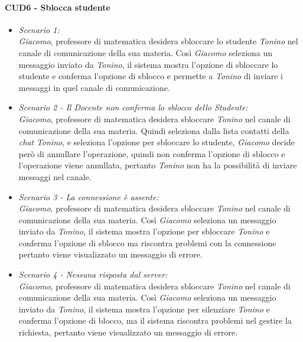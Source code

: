 \paragraph{CUD6 - Sblocca studente\\}
\begin{itemize}
	\item \textit{Scenario 1:\\}
	\textit{Giacomo}, professore di matematica desidera sbloccare lo studente \textit{Tonino} nel canale di comunicazione della sua materia. Così \textit{Giacomo} seleziona un messaggio inviato da \textit{Tonino}, il sistema mostra l’opzione di sbloccare lo studente e conferma l’opzione di sblocco e permette a \textit{Tonino} di inviare i messaggi in quel canale di comunicazione.\\
	
	\item \textit{Scenario 2 - Il Docente non conferma lo sblocco dello Studente:\\}
	\textit{Giacomo}, professore di matematica desidera sbloccare \textit{Tonino} nel canale di comunicazione della sua materia. Quindi seleziona dalla lista contatti della \textit{chat} \textit{Tonino}, e seleziona l’opzione per sbloccare lo studente, \textit{Giacomo} decide però di annullare l’operazione, quindi non conferma l’opzione di sblocco e l’operazione viene annullata, pertanto \textit{Tonino} non ha la possibilità di inviare messaggi nel canale.\\
	
	\item \textit{Scenario 3 - La connessione è assente:\\}
	\textit{Giacomo}, professore di matematica desidera sbloccare \textit{Tonino} nel canale di comunicazione della sua materia. Così \textit{Giacomo} seleziona un messaggio inviato da \textit{Tonino}, il sistema mostra l’opzione per sbloccare \textit{Tonino} e conferma l’opzione di sblocco ma riscontra problemi con la connessione pertanto viene visualizzato un messaggio di errore.\\
	
	\item \textit{Scenario 4 - Nessuna risposta dal server:\\}
	\textit{Giacomo}, professore di matematica desidera sbloccare \textit{Tonino} nel canale di comunicazione della sua materia. Così \textit{Giacomo} seleziona un messaggio inviato da \textit{Tonino}, il sistema mostra l’opzione per silenziare \textit{Tonino} e conferma l’opzione di blocco, ma il sistema riscontra problemi nel gestire la richiesta, pertanto viene visualizzato un messaggio di errore.\\
\end{itemize}

